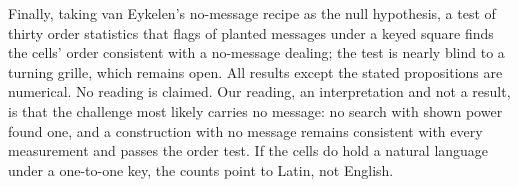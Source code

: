 Finally, taking van Eykelen's no-message recipe as the null hypothesis, a test of thirty order statistics that flags \nmSquare{} of \nmPlanted{} planted messages under a keyed square finds the cells' order consistent with a no-message dealing; the test is nearly blind to a turning grille, which remains open. All results except the stated propositions are numerical. No reading is claimed. Our reading, an interpretation and not a result, is that the challenge most likely carries no message: no search with shown power found one, and a construction with no message remains consistent with every measurement and passes the order test. If the cells do hold a natural language under a one-to-one key, the counts point to Latin, not English.
